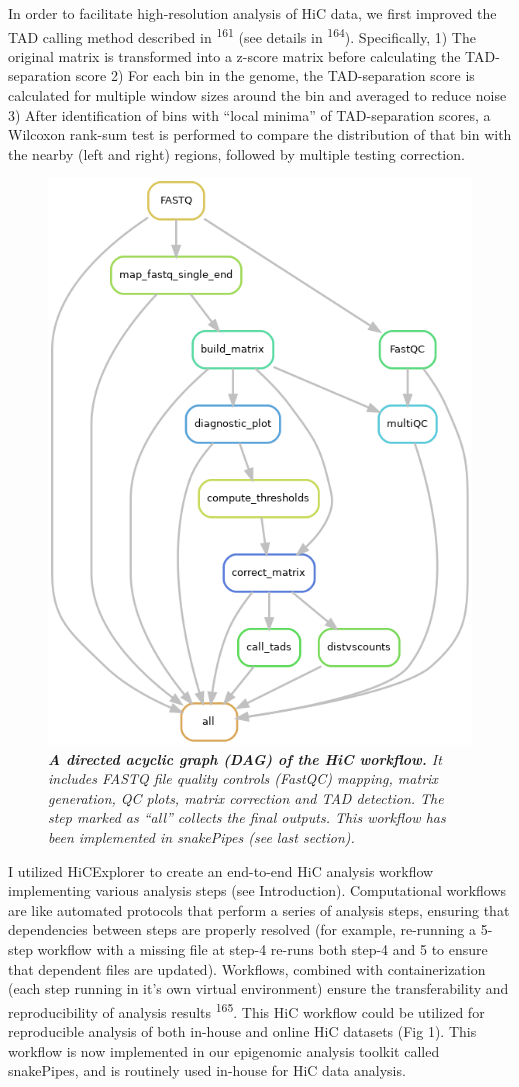 \documentclass[11pt,twoside]{MPIthesis}
\theoremstyle{definition}
\theoremstyle{definition}
\theoremstyle{definition}
\theoremstyle{remark}
\begin{document}
In order to facilitate high-resolution analysis of HiC data, we first
improved the TAD calling method described in \textsuperscript{161} (see
details in \textsuperscript{164}). Specifically, 1) The original matrix
is transformed into a z-score matrix before calculating the
TAD-separation score 2) For each bin in the genome, the TAD-separation
score is calculated for multiple window sizes around the bin and
averaged to reduce noise 3) After identification of bins with ``local
minima'' of TAD-separation scores, a Wilcoxon rank-sum test is performed
to compare the distribution of that bin with the nearby (left and right)
regions, followed by multiple testing correction.
\begin{figure}

{\centering \includegraphics[width=0.5\linewidth]{figures/results_fig1} 

}

\caption[A directed acyclic graph (DAG) of the HiC workflow]{\emph{\textbf{A directed acyclic graph (DAG) of the HiC
workflow.} It includes FASTQ file quality controls (FastQC) mapping,
matrix generation, QC plots, matrix correction and TAD detection. The
step marked as ``all'' collects the final outputs. This workflow has
been implemented in snakePipes (see last section).}}\label{fig:unnamed-chunk-6}
\end{figure}






I utilized HiCExplorer to create an end-to-end HiC analysis workflow
implementing various analysis steps (see Introduction). Computational
workflows are like automated protocols that perform a series of analysis
steps, ensuring that dependencies between steps are properly resolved
(for example, re-running a 5-step workflow with a missing file at step-4
re-runs both step-4 and 5 to ensure that dependent files are updated).
Workflows, combined with containerization (each step running in it's own
virtual environment) ensure the transferability and reproducibility of
analysis results \textsuperscript{165}. This HiC workflow could be
utilized for reproducible analysis of both in-house and online HiC
datasets (Fig 1). This workflow is now implemented in our epigenomic
analysis toolkit called snakePipes, and is routinely used in-house for
HiC data analysis.
\end{document}
